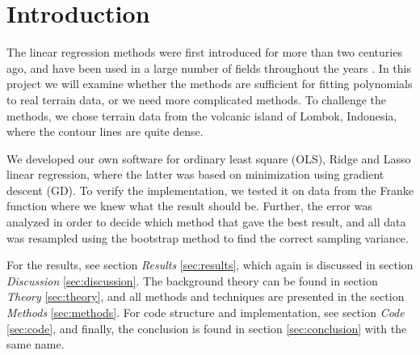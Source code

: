 \section{Introduction} \label{sec:introduction}
The linear regression methods were first introduced for more than two centuries ago, and have been used in a large number of fields throughout the years \cite{Gauss}\cite{Legende}. In this project we will examine whether the methods are sufficient for fitting polynomials to real terrain data, or we need more complicated methods. To challenge the methods, we chose terrain data from the volcanic island of Lombok, Indonesia, where the contour lines are quite dense. 

We developed our own software for ordinary least square (OLS), Ridge and Lasso linear regression, where the latter was based on minimization using gradient descent (GD). To verify the implementation, we tested it on data from the Franke function where we knew what the result should be. Further, the error was analyzed in order to decide which method that gave the best result, and all data was resampled using the bootstrap method to find the correct sampling variance. 

For the results, see section \textit{Results} \eqref{sec:results}, which again is discussed in section \textit{Discussion} \eqref{sec:discussion}. The background theory can be found in section \textit{Theory} \eqref{sec:theory}, and all methods and techniques are presented in the section \textit{Methods} \eqref{sec:methods}. For code structure and implementation, see section \textit{Code} \eqref{sec:code}, and finally, the conclusion is found in section \eqref{sec:conclusion} with the same name.